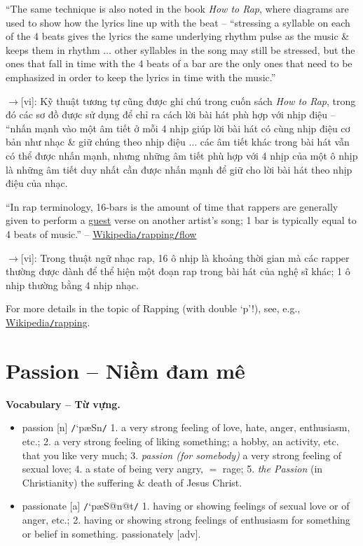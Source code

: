 \documentclass[12pt,oneside]{book}
\begin{document}
``The same technique is also noted in the book {\it How to Rap}, where diagrams are used to show how the lyrics line up with the beat -- ``stressing a syllable on each of the 4 beats gives the lyrics the same underlying rhythm pulse as the music \& keeps them in rhythm $\ldots$ other syllables in the song may still be stressed, but the ones that fall in time with the 4 beats of a bar are the only ones that need to be emphasized in order to keep the lyrics in time with the music.''

{\sf[en]$\to$[vi]}: Kỹ thuật tương tự cũng được ghi chú trong cuốn sách {\it How to Rap}, trong đó các sơ đồ được sử dụng để chỉ ra cách lời bài hát phù hợp với nhịp điệu -- ``nhấn mạnh vào một âm tiết ở mỗi 4 nhịp giúp lời bài hát có cùng nhịp điệu cơ bản như nhạc \& giữ chúng theo nhịp điệu $\ldots$ các âm tiết khác trong bài hát vẫn có thể được nhấn mạnh, nhưng những âm tiết phù hợp với 4 nhịp của một ô nhịp là những âm tiết duy nhất cần được nhấn mạnh để giữ cho lời bài hát theo nhịp điệu của nhạc.

``In rap terminology, 16-bars is the amount of time that rappers are generally given to perform a \href{https://en.wikipedia.org/wiki/Guest_appearance}{guest} verse on another artist's song; 1 bar is typically equal to 4 beats of music.'' -- \href{https://en.wikipedia.org/wiki/Rapping#Flow}{Wikipedia{\tt/}rapping{\tt/}flow}

{\sf[en]$\to$[vi]}: Trong thuật ngữ nhạc rap, 16 ô nhịp là khoảng thời gian mà các rapper thường được dành để thể hiện một đoạn rap trong bài hát của nghệ sĩ khác; 1 ô nhịp thường bằng 4 nhịp nhạc.

For more details in the topic of Rapping (with double `p'!), see, e.g., \href{https://en.wikipedia.org/wiki/Rapping}{Wikipedia{\tt/}rapping}.

\section{Passion -- Niềm đam mê}
\textbf{\textsf{\small Vocabulary -- Từ vựng.}}
\begin{itemize}\small
	\item {\sf passion} [n] {\tt/}`p\ae Sn{\tt/} 1. a very strong feeling of love, hate, anger, enthusiasm, etc.; 2. a very strong feeling of liking something; a hobby, an activity, etc. that you like very much; 3. {\it passion (for somebody)} a very strong feeling of sexual love; 4. a state of being very angry, $=$ {\sf rage}; 5. {\it the Passion} (in Christianity) the suffering \& death of {\sf Jesus Christ}.
	\item {\sf passionate} [a] {\tt/}`p\ae S@n@t{\tt/} 1. having or showing feelings of sexual love or of anger, etc.; 2. having or showing strong feelings of enthusiasm for something or belief in something. {\sf passionately} [adv].
\end{itemize}
\end{document}
